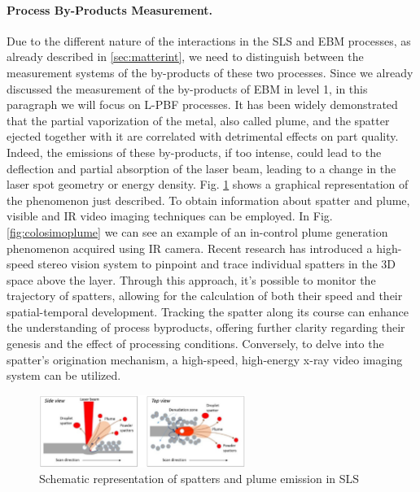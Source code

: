 \paragraph{Process By-Products Measurement.} Due to the different nature of the interactions in the SLS and EBM processes, as already described in \ref{sec:matterint}, we need to distinguish between the measurement systems of the by-products of these two processes. Since we already discussed the measurement of the by-products of EBM in level 1, in this paragraph we will focus on L-PBF processes. It has been widely demonstrated that the partial vaporization of the metal, also called plume, and the spatter ejected together with it are correlated with detrimental effects on part quality. Indeed, the emissions of these by-products, if too intense, could lead to the deflection and partial absorption of the laser beam, leading to a change in the laser spot geometry or energy density. Fig. \ref{fig:plume} shows a graphical representation of the phenomenon just described. To obtain information about spatter and plume, visible and IR video imaging techniques can be employed. In Fig. \ref{fig:colosimoplume} we can see an example of an in-control plume generation phenomenon acquired using IR camera. Recent research has introduced a high-speed stereo vision system to pinpoint and trace individual spatters in the 3D space above the layer. Through this approach, it's possible to monitor the trajectory of spatters, allowing for the calculation of both their speed and their spatial-temporal development. Tracking the spatter along its course can enhance the understanding of process byproducts, offering further clarity regarding their genesis and the effect of processing conditions. Conversely, to delve into the spatter's origination mechanism, a high-speed, high-energy x-ray video imaging system can be utilized.
\begin{figure}
    \centering
    \includegraphics[width = 0.6\textwidth]{Images/plume.png}
    \caption[Spatters and plume in SLS]{Schematic representation of spatters and plume emission in SLS \cite{grasso_-situ_2021}}
    \label{fig:plume}
\end{figure}

